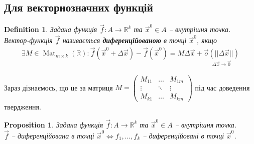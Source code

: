 \documentclass[a4paper, 10pt]{article}
\theoremstyle{theoremdd}
\theoremstyle{theoremdd}
\theoremstyle{theoremdd}
\newtheorem{definition}[theorem]{Definition}
\theoremstyle{theoremdd}
\theoremstyle{theoremdd}
\theoremstyle{theoremdd}
\newtheorem{proposition}[theorem]{Proposition}
\theoremstyle{theoremdd}
\theoremstyle{theoremdd}
\theoremstyle{theoremdd}
\DeclareMathOperator{\Mat}{Mat}
\begin{document}
\subsection{Для векторнозначних функцій}
\begin{definition}
Задана функція $\vec{f}\colon A \to \mathbb{R}^k$ та $\vec{x}^0 \in A$ -- внутрішня точка.\\
Вектор-функція $\vec{f}$ називається \textbf{диференційованою} в точці $\vec{x}^0$, якщо
\begin{align*}
\exists M \in \Mat_{m \times k}(\mathbb{R}): \vec{f}(\vec{x}^0 + \Delta \vec{x}) - \vec{f}(\vec{x}^0) = M \Delta \vec{x} + \underset{\Delta \vec{x} \to \vec{0}}{\vec{o}(||\Delta \vec{x}||)}
\end{align*}
\end{definition}
Зараз дізнаємось, що це за матриця $M = \begin{pmatrix}
M_{11} & \dots & M_{1m} \\
\vdots & \ddots & \vdots \\
M_{k1} & \dots & M_{km}
\end{pmatrix}$ під час доведення твердження.

\begin{proposition}
Задана функція $\vec{f}\colon A \to \mathbb{R}^k$ та $\vec{x}^0 \in A$ -- внутрішня точка.\\
$\vec{f}$ -- диференційована в точці $\vec{x}^0 \iff f_1,\dots,f_k$ -- диференційовані в точці $\vec{x}^0$.
\end{proposition}
\end{document}
